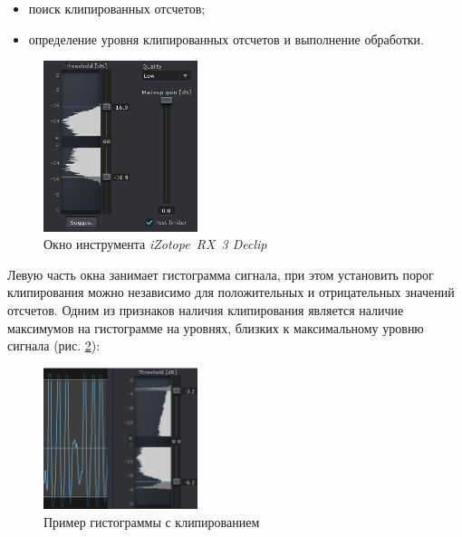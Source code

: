 \documentclass[oneside, final, 14pt]{extreport}
\begin{document}
\begin{itemize}
  \item поиск клипированных отсчетов;
  \item определение уровня клипированных отсчетов и выполнение обработки.
\end{itemize}

\begin{figure}[h!]
\centering
\includegraphics[width=0.4\textwidth]{pic-rx3declip-01}
\caption{Окно инструмента \textit{iZotope~RX~3 Declip}}
\label{pic-rx3declip-01}
\end{figure}

Левую часть окна занимает гистограмма сигнала, при этом установить порог клипирования можно независимо для положительных и отрицательных значений отсчетов. Одним из признаков наличия клипирования является наличие максимумов на гистограмме на уровнях, близких к максимальному уровню сигнала (рис. \ref{pic-rx3declip-02}):

\begin{figure}[h!t]
\centering
\includegraphics[width=0.4\textwidth]{pic-rx3declip-02}
\caption{Пример гистограммы с клипированием}
\label{pic-rx3declip-02}
\end{figure}
\end{document}
